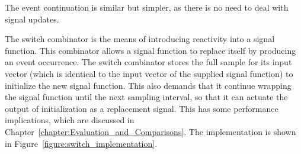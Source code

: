 The event continuation is similar but simpler, as there is no need to deal
with signal updates.

The switch combinator is the means of introducing reactivity into a signal
function. This combinator allows a signal function to replace itself by
producing an event occurrence. The switch combinator stores the full sample
for its input vector (which is identical to the input vector of the supplied
signal function) to initialize the new signal function. This also demands that
it continue wrapping the signal function until the next sampling interval, so
that it can actuate the output of initialization as a replacement signal. This
has some performance implications, which are discussed in
Chapter~\ref{chapter:Evaluation_and_Comparisons}. The implementation is shown in
Figure~\ref{figure:switch_implementation}.

